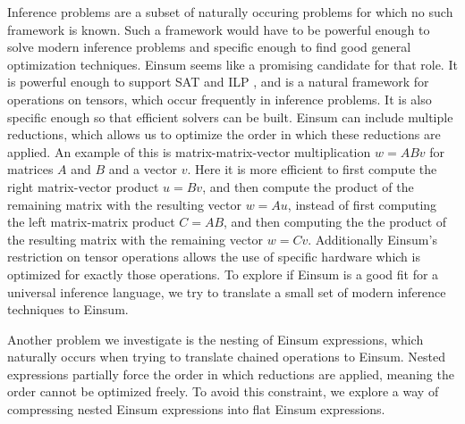 Inference problems are a subset of naturally occuring problems for which no such framework is known.
Such a framework would have to be powerful enough to solve modern inference problems and specific enough to find good general optimization techniques.
Einsum seems like a promising candidate for that role.
It is powerful enough to support SAT \cite{Biamonte2014} and ILP \cite{Blacher2023}, and is a natural framework for operations on tensors, which occur frequently in inference problems.
It is also specific enough so that efficient solvers can be built.
Einsum can include multiple reductions, which allows us to optimize the order in which these reductions are applied.
An example of this is matrix-matrix-vector multiplication $w = A B v$ for matrices $A$ and $B$ and a vector $v$.
Here it is more efficient to first compute the right matrix-vector product $u = Bv$, and then compute the product of the remaining matrix with the resulting vector $w = Au$,
instead of first computing the left matrix-matrix product $C = AB$, and then computing the the product of the resulting matrix with the remaining vector $w = Cv$.
Additionally Einsum's restriction on tensor operations allows the use of specific hardware which is optimized for exactly those operations.
To explore if Einsum is a good fit for a universal inference language,
we try to translate a small set of modern inference techniques to Einsum.

Another problem we investigate is the nesting of Einsum expressions, which naturally occurs when trying to translate chained operations to Einsum.
Nested expressions partially force the order in which reductions are applied, meaning the order cannot be optimized freely.
To avoid this constraint, we explore a way of compressing nested Einsum expressions into flat Einsum expressions.